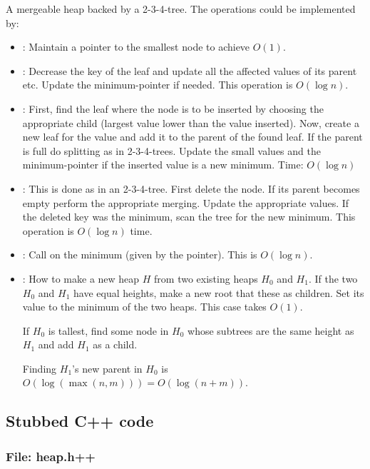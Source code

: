 \documentclass[10pt,oneside,a4paper,final,english]{memoir}
\begin{document}
A mergeable heap backed by a 2-3-4-tree. The operations could be
implemented by:

\begin{itemize}
\item {}: Maintain a pointer to the smallest node to
  achieve $O(1)$.

\item {}: Decrease the key of the leaf and update all
  the affected  values of its parent etc. Update the
  minimum-pointer if needed. This operation is $O(\log n)$.

\item {}: First, find the leaf where the node is to be
  inserted by choosing the appropriate child (largest  value
  lower than the value inserted). Now, create a new leaf for the value
  and add it to the parent of the found leaf. If the parent is full do
  splitting as in 2-3-4-trees. Update the small values and the
  minimum-pointer if the inserted value is a new minimum. Time:
  $O(\log n)$

\item {}: This is done as in an 2-3-4-tree. First delete the
  node. If its parent becomes empty perform the appropriate
  merging. Update the appropriate  values. If the deleted
  key was the minimum, scan the tree for the new minimum. This
  operation is $O(\log n)$ time.

\item {}: Call  on the minimum (given by the
  pointer). This is $O(\log n)$.

\item {}: How to make a new heap $H$ from two existing heaps
  $H_0$ and $H_1$. If the two $H_0$ and $H_1$ have equal heights, make
  a new root that these as children. Set its  value to the
  minimum of the two heaps. This case takes $O(1)$.

  If $H_0$ is tallest, find some node in $H_0$ whose subtrees are the
  same height as $H_1$ and add $H_1$ as a child.

  Finding $H_1$'s new parent in $H_0$ is $O(\log(\max(n,m))) = O(\log
  (n+m))$.
\end{itemize}




\subsection{Stubbed C++ code}
\subsubsection{File: heap.h++}

\end{document}

